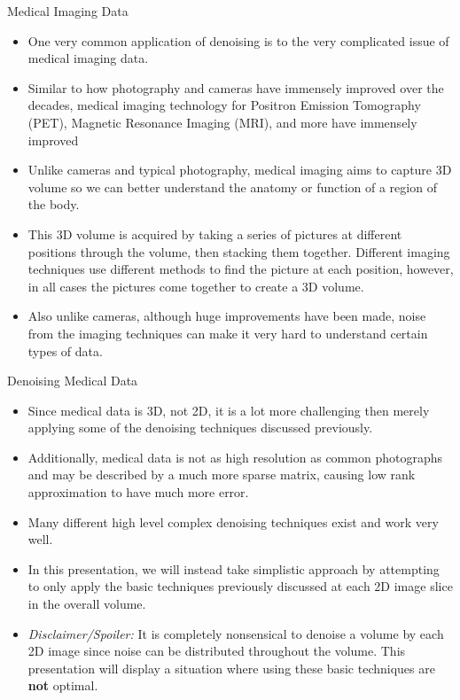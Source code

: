 \documentclass[aspectratio=169,xcolor=dvipsnames]{beamer}
\begin{document}
	
	\begin{frame}{Medical Imaging Data}
		\begin{itemize}
			\item One very common application of denoising is to the very complicated issue of medical imaging data.
			\item Similar to how photography and cameras have immensely improved over the decades, medical imaging technology for Positron Emission Tomography (PET), Magnetic Resonance Imaging (MRI), and more have immensely improved
			\item Unlike cameras and typical photography, medical imaging aims to capture 3D volume so we can better understand the anatomy or function of a region of the body. 
			\item This 3D volume is acquired by taking a series of pictures at different positions through the volume, then stacking them together. Different imaging techniques use different methods to find the picture at each position, however, in all cases the pictures come together to create a 3D volume.
			\item Also unlike cameras, although huge improvements have been made, noise from the imaging techniques can make it very hard to understand certain types of data.
		\end{itemize}
	\end{frame}


	\begin{frame}{Denoising Medical Data}
		\begin{itemize}
			\item Since medical data is 3D, not 2D, it is a lot more challenging then merely applying some of the denoising techniques discussed previously. 
			\item Additionally, medical data is not as high resolution as common photographs and may be described by a much more sparse matrix, causing low rank approximation to have much more error.
			\item Many different high level complex denoising techniques exist and work very well.
			\item In this presentation, we will instead take simplistic approach by attempting to only apply the basic techniques previously discussed at each 2D image slice in the overall volume.
			\item \textit{Disclaimer/Spoiler: } It is completely nonsensical to denoise a volume by each 2D image since noise can be distributed throughout the volume. This presentation will display a situation where using these basic techniques are \textbf{not} optimal.
		\end{itemize}
	\end{frame}
	
\end{document}
